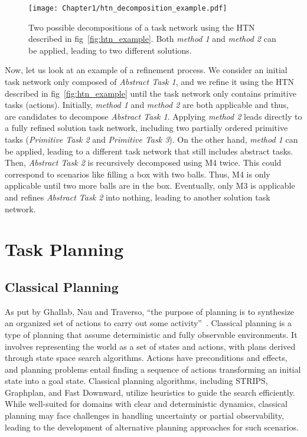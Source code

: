 \begin{figure}
    \center
    \texttt{[image: Chapter1/htn\_decomposition\_example.pdf]}
    \caption{Two possible decompositions of a task network using the HTN described in fig~\ref{fig:htn_example}. Both \emph{method 1} and \emph{method 2} can be applied, leading to two different solutions.
    }
    \label{fig:htn_decomposition_example}
\end{figure}

Now, let us look at an example of a refinement process. We consider an initial task network only composed of \emph{Abstract Task 1}, and we refine it using the HTN described in fig~\ref{fig:htn_example} until the task network only contains primitive tasks (actions). Initially, \emph{method 1} and \emph{method 2} are both applicable and thus, are candidates to decompose \emph{Abstract Task 1}. Applying \emph{method 2} leads directly to a fully refined solution task network, including two partially ordered primitive tasks (\emph{Primitive Task 2} and \emph{Primitive Task 3}). On the other hand, \emph{method 1} can be applied, leading to a different task network that still includes abstract tasks. Then, \emph{Abstract Task 2} is recursively decomposed using M4 twice. This could correspond to scenarios like filling a box with two balls. Thus, M4 is only applicable until two more balls are in the box. Eventually, only M3 is applicable and refines \emph{Abstract Task 2} into nothing, leading to another solution task network.

\section{Task Planning}

\subsection{Classical Planning}

As put by Ghallab, Nau and Traverso, “the purpose of planning is to synthesize an organized set of actions to carry out some activity”~\cite{ghallab2016automated}. 
Classical planning is a type of planning that assume deterministic and fully observable environments. It involves representing the world as a set of states and actions, with plans derived through state space search algorithms. Actions have preconditions and effects, and planning problems entail finding a sequence of actions transforming an initial state into a goal state. Classical planning algorithms, including STRIPS, Graphplan, and Fast Downward, utilize heuristics to guide the search efficiently. While well-suited for domains with clear and deterministic dynamics, classical planning may face challenges in handling uncertainty or partial observability, leading to the development of alternative planning approaches for such scenarios.


